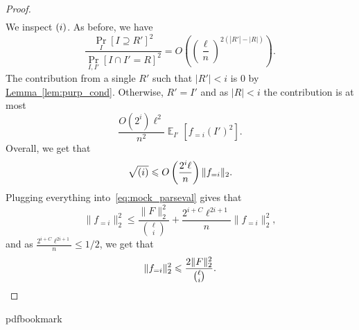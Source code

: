 \documentclass[11pt]{article}
\newcommand{\expref}[2]{\texorpdfstring{\hyperref[#2]{#1~\ref{#2}}}{#1~\ref{#2}}}
\newcommand{\rom}[1]{\uppercase\expandafter{\romannumeral #1\relax}}
\newcommand\card[1]{\left| {#1} \right|}
\newcommand\Prob[2]{{\Pr_{#1}\left[ {#2} \right]}}
\newcommand\Expect[2]{{\mathop{\mathbb{E}}_{#1}\left[ {#2} \right]}}
\newcommand\norm[1]{\| #1 \|}
\renewcommand\leq{\leqslant}
\newcommand\lvlfn[2]{{#1}_{={#2}}}
\begin{document}
\begin{proof}
\begin{align*}
  \end{align*}
  We inspect $(\rom{1})$. As before, we have
  \[
  \frac{\Prob{I}{I\supseteq R'}^2}{\Prob{I,I'}{I\cap I' = R}^2}
  =O\left(\left(\frac{\ell}{n}\right)^{2(\card{R'}-\card{R})}\right).
  \]
  The contribution from a single $R'$ such that $\card{R'} < i$ is $0$ by \expref{Lemma}{lem:purp_cond}. Otherwise, $R' = I'$ and as $\card{R}<i$ the contribution is at most
  \[
  \frac{O(2^i) \ell^2}{n^2}\Expect{I'}{\lvlfn{f}{i}(I')^2}.
  \]
  Overall, we get that
  \[
  \sqrt{(\rom{1})}\leq
  O\left(\frac{2^i \ell}{n}\right)\norm{\lvlfn{f}{i}}_2.
  \]
  Plugging everything into~\eqref{eq:mock_parseval} gives that
  \[
  \norm{\lvlfn{f}{i}}_2^2
  \leq
  \frac{\norm{F}_2^2}{\binom{\ell}{i}}
  +\frac{2^{i+C} \ell^{2i+1}}{n}\norm{\lvlfn{f}{i}}_2^2,
  \]
  and as $\frac{2^{i+C} \ell^{2i+1}}{n}\leq 1/2$, we get that
  \[
  \norm{\lvlfn{f}{i}}_2^2\leq \frac{2\norm{F}_2^2}{\binom{\ell}{i}}.
  \qedhere
  \]
\end{proof}

%
%
%



\newcommand{\prelim}{Preliminary version in\ }\newcommand{\prelims}{Preliminary
  versions in\ }
\providecommand{\bibhead}[1]{}
\expandafter\ifx\csname pdfbookmark\endcsname\relax%
  \providecommand{\tocrefpdfbookmark}{}
\else\providecommand{\tocrefpdfbookmark}{%
   \hypertarget{tocreferences}{}%
   \pdfbookmark[1]{References}{tocreferences}}%
\fi
\end{document}
